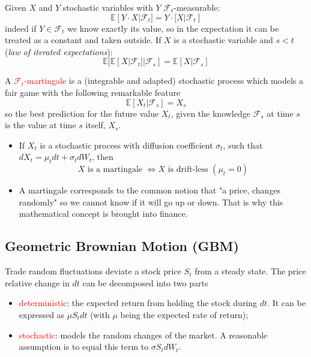 \documentclass[12pt,a4paper]{article}
\begin{document}
Given $X$ and $Y$ stochastic variables with $Y$ $\mathcal{F}_t$-measurable:
\begin{equation*}
\mathbb{E}[Y\cdot X|\mathcal{F}_t] =  Y\cdot\mathbb[X|\mathcal{F}_t]
\end{equation*}
indeed if $Y\in\mathcal{F}_t$ we know exactly its value, so in the expectation it can be treated as a constant and taken outside.
If $X$ is a stochastic variable and $s<t$ (\emph{law of iterated expectations}):
\begin{equation*}
\mathbb{E}[\mathbb{E}[X|\mathcal{F}_t]|\mathcal{F}_s] = \mathbb{E}[X|\mathcal{F}_s]
\end{equation*}

A \textcolor{red}{$\mathcal{F}_t$-martingale} is a (integrable and adapted) stochastic process which models a fair game with the following remarkable feature
\begin{equation}
\mathbb{E}[X_t|\mathcal{F}_s] = X_s
\end{equation}
so the best prediction for the future value $X_t$, given the knowledge $\mathcal{F}_s$ at time $s$ is the value at time $s$ itself, $X_s$.
		
\begin{itemize}
\item If $X_t$ is a stochastic process with diffusion coefficient $\sigma_t$, such that %
$dX_t=\mu_t dt+\sigma_t dW_t$, then 
\begin{equation*}
X\text{ is a martingale } \iff X\text{ is drift-less } (\mu_t=0)
\end{equation*}
\item A martingale corresponds to the common notion that "a price, changes randomly" so we cannot know if it will go up or down. That is why this mathematical concept is brought into finance.
\end{itemize}	
	
\subsection{Geometric Brownian Motion (GBM)}
Trade random fluctuations deviate a stock price $S_t$ from a steady state.
The price relative change in $dt$ can be decomposed into two parts
\begin{itemize}
\item \textcolor{red}{deterministic}: the expected return from holding the stock during $dt$. It can be expressed as $\mu S_tdt$ (with $\mu$ being the expected rate of return);
\item \textcolor{red}{stochastic}: models the random changes of the market. A reasonable assumption is to equal this term to $\sigma S_t dW_t$. 
\end{itemize}
\end{document}
